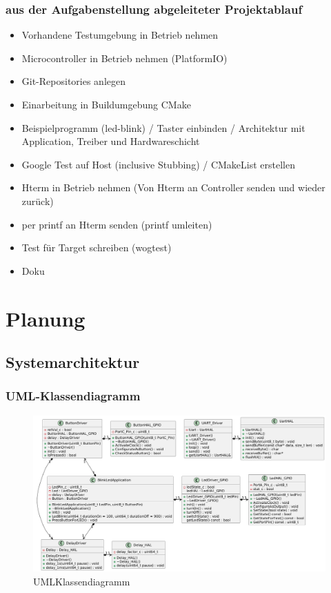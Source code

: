 \documentclass[12pt,a4paper]{article}
\begin{document}
\newpage
\subsubsection{aus der Aufgabenstellung abgeleiteter Projektablauf}
\begin{itemize}
  \item Vorhandene Testumgebung in Betrieb nehmen
  \item Microcontroller in Betrieb nehmen (PlatformIO)
  \item Git-Repositories anlegen
  \item Einarbeitung in Buildumgebung CMake
  \item Beispielprogramm (led-blink) / Taster einbinden / Architektur mit Application, Treiber und Hardwareschicht
  \item Google Test auf Host (inclusive Stubbing) / CMakeList erstellen
  \item Hterm in Betrieb nehmen (Von Hterm an Controller senden und wieder zurück)
  \item per printf an Hterm senden (printf umleiten)
  \item Test für Target schreiben (wogtest)
  \item Doku
\end{itemize}



\newpage

\section{Planung}
\subsection{Systemarchitektur}
\subsubsection{UML-Klassendiagramm}
\begin{figure}[htbp]
  \centering
  \includegraphics[width=\textwidth]{LED_Blink_UML.png}
  \caption{UMLKlassendiagramm}
  \label{fig:uml_led_blink}
\end{figure}
\end{document}
